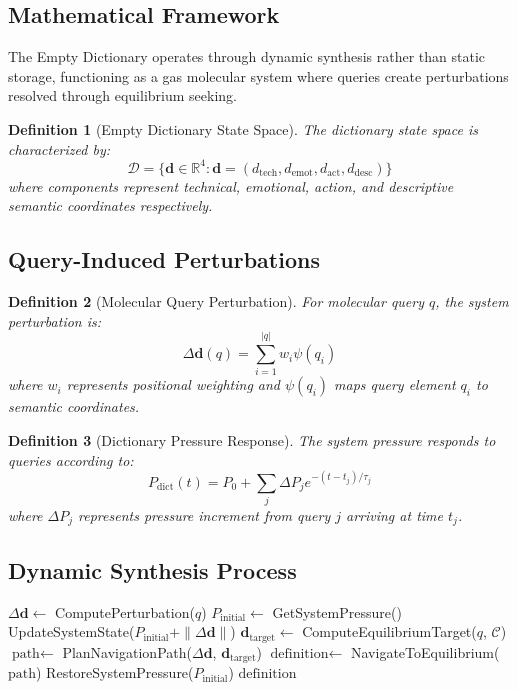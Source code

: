 \documentclass[12pt,a4paper]{article}
\newtheorem{definition}{Definition}
\begin{document}
\subsection{Mathematical Framework}

The Empty Dictionary operates through dynamic synthesis rather than static storage, functioning as a gas molecular system where queries create perturbations resolved through equilibrium seeking.

\begin{definition}[Empty Dictionary State Space]
The dictionary state space is characterized by:
$$\mathcal{D} = \{\mathbf{d} \in \mathbb{R}^4 : \mathbf{d} = (d_{\text{tech}}, d_{\text{emot}}, d_{\text{act}}, d_{\text{desc}})\}$$
where components represent technical, emotional, action, and descriptive semantic coordinates respectively.
\end{definition}

\subsection{Query-Induced Perturbations}

\begin{definition}[Molecular Query Perturbation]
For molecular query $q$, the system perturbation is:
$$\Delta \mathbf{d}(q) = \sum_{i=1}^{|q|} w_i \psi(q_i)$$
where $w_i$ represents positional weighting and $\psi(q_i)$ maps query element $q_i$ to semantic coordinates.
\end{definition}

\begin{definition}[Dictionary Pressure Response]
The system pressure responds to queries according to:
$$P_{\text{dict}}(t) = P_0 + \sum_j \Delta P_j e^{-(t-t_j)/\tau_j}$$
where $\Delta P_j$ represents pressure increment from query $j$ arriving at time $t_j$.
\end{definition}

\subsection{Dynamic Synthesis Process}

\begin{algorithm}[H]
\caption{Empty Dictionary Synthesis}
\begin{algorithmic}[1]
    \State $\Delta \mathbf{d} \gets$ ComputePerturbation($q$)
    \State $P_{\text{initial}} \gets$ GetSystemPressure()
    \State UpdateSystemState($P_{\text{initial}} + \|\Delta \mathbf{d}\|$)
    \State $\mathbf{d}_{\text{target}} \gets$ ComputeEquilibriumTarget($q$, $\mathcal{C}$)
    \State $\text{path} \gets$ PlanNavigationPath($\Delta \mathbf{d}$, $\mathbf{d}_{\text{target}}$)
    \State $\text{definition} \gets$ NavigateToEquilibrium($\text{path}$)
    \State RestoreSystemPressure($P_{\text{initial}}$)
    \State \Return $\text{definition}$
\EndProcedure
\end{algorithmic}
\end{algorithm}
\end{document}
